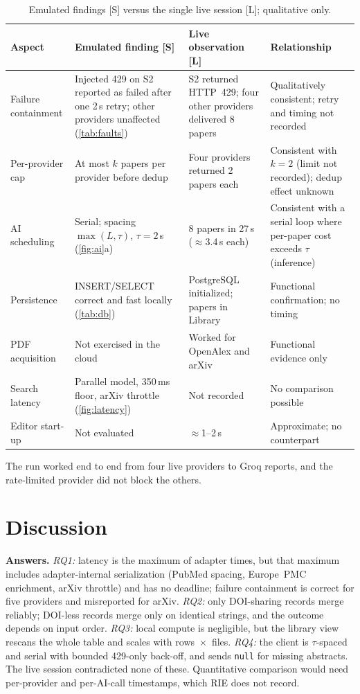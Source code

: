 \documentclass[conference]{IEEEtran}
\newcommand{\code}[1]{\texttt{\small #1}}
\newcommand{\RIE}{RIE}
\begin{document}
\begin{table}[t]
\centering
\caption{Emulated findings [S] versus the single live session [L]; qualitative only.}
\label{tab:livecmp}
\footnotesize
\begin{tabular}{@{}L{2.4cm} L{4.6cm} L{4.0cm} L{5.6cm}@{}}
\toprule
Aspect & Emulated finding [S] & Live observation [L] & Relationship \\
\midrule
Failure containment & Injected 429 on S2 reported as failed after one 2\,s retry; other providers unaffected (\cref{tab:faults}) & S2 returned HTTP~429; four other providers delivered 8 papers & Qualitatively consistent; retry and timing not recorded \\
Per-provider cap & At most $k$ papers per provider before dedup & Four providers returned 2 papers each & Consistent with $k{=}2$ (limit not recorded); dedup effect unknown \\
AI scheduling & Serial; spacing $\max(L,\tau)$, $\tau{=}2$\,s (\cref{fig:ai}a) & 8 papers in 27\,s ($\approx$3.4\,s each) & Consistent with a serial loop where per-paper cost exceeds $\tau$ (inference) \\
Persistence & INSERT/SELECT correct and fast locally (\cref{tab:db}) & PostgreSQL initialized; papers in Library & Functional confirmation; no timing \\
PDF acquisition & Not exercised in the cloud & Worked for OpenAlex and arXiv & Functional evidence only \\
Search latency & Parallel model, 350\,ms floor, arXiv throttle (\cref{fig:latency}) & Not recorded & No comparison possible \\
Editor start-up & Not evaluated & $\approx$1--2\,s & Approximate; no counterpart \\
\bottomrule
\end{tabular}
\end{table}

The run worked end to end from four live providers to Groq reports, and the rate-limited provider did not block the others.

\section{Discussion}
\label{sec:disc}

\textbf{Answers.} \emph{RQ1:} latency is the maximum of adapter times, but that maximum includes adapter-internal serialization (PubMed spacing, Europe~PMC enrichment, arXiv throttle) and has no deadline; failure containment is correct for five providers and misreported for arXiv. \emph{RQ2:} only DOI-sharing records merge reliably; DOI-less records merge only on identical strings, and the outcome depends on input order. \emph{RQ3:} local compute is negligible, but the library view rescans the whole table and scales with rows~$\times$~files. \emph{RQ4:} the client is $\tau$-spaced and serial with bounded 429-only back-off, and sends \code{null} for missing abstracts. The live session contradicted none of these. Quantitative comparison would need per-provider and per-AI-call timestamps, which \RIE{} does not record.
\end{document}
